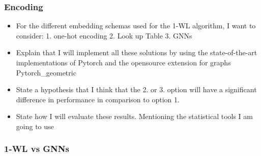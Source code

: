 \documentclass[11pt, dvipsnames, DIV=12]{scrreprt}
\theoremstyle{definition}
\begin{document}
\subsubsection{Encoding}
\begin{itemize}
    \item For the different embedding schemas used for the 1-WL algorithm, I want to consider: 1. one-hot encoding 2. Look up Table 3. GNNs
    \item Explain that I will implement all these solutions by using the state-of-the-art implementations of Pytorch and the opensource extension for graphs Pytorch\_geometric
    \item State a hypothesis that I think that the 2. or 3. option will have a significant difference in performance in comparison to option 1.
    \item State how I will evaluate these results. Mentioning the statistical tools I am going to use
\end{itemize}

\subsubsection{1-WL vs GNNs}


\end{document}
